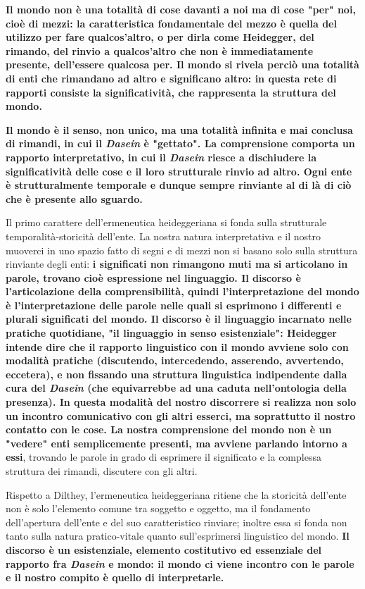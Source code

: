 \textbf{Il mondo non è una totalità di cose davanti a noi
ma di cose "per" noi, cioè di mezzi: la caratteristica
fondamentale del mezzo è quella del utilizzo per
fare qualcos'altro, o per dirla come Heidegger, del
rimando, del rinvio a qualcos'altro che non è
immediatamente presente, dell'essere qualcosa per.
Il mondo si rivela perciò una totalità di enti che
rimandano ad altro e significano altro: in questa
rete di rapporti consiste la significatività, che rappresenta la
struttura del mondo.}

\textbf{Il mondo è il senso, non unico, ma una totalità
infinita e mai conclusa di rimandi, in cui il \textit{Dasein}
è "gettato".
La comprensione comporta un rapporto interpretativo,
in cui il \textit{Dasein} riesce a dischiudere la
significatività delle cose e il loro strutturale
rinvio ad altro. Ogni ente è strutturalmente
temporale e dunque sempre rinviante al di là di
ciò che è presente allo sguardo.}

Il primo carattere dell'ermeneutica heideggeriana si fonda sulla strutturale
temporalità-storicità dell'ente.
La nostra natura interpretativa e il nostro muoverci in uno spazio fatto di segni e
di mezzi non si
basano solo sulla struttura rinviante degli enti:
\textbf{i significati non rimangono muti ma si
articolano in parole, trovano cioè espressione
nel linguaggio.
Il discorso è l'articolazione della comprensibilità,
quindi l'interpretazione del mondo è l'interpretazione delle parole nelle quali si esprimono i differenti e plurali significati del mondo.
Il discorso è il linguaggio incarnato nelle pratiche
quotidiane, "il linguaggio in senso esistenziale": Heidegger intende dire che
il rapporto linguistico con il mondo avviene solo con
modalità pratiche (discutendo, intercedendo, asserendo,
avvertendo, eccetera), e non fissando una struttura
linguistica indipendente dalla cura del \textit{Dasein}
(che equivarrebbe ad una caduta nell'ontologia
della presenza).
In questa modalità del nostro discorrere si realizza
non solo un incontro comunicativo con gli altri
esserci, ma soprattutto il nostro contatto con le
cose. La nostra comprensione del mondo non
è un "vedere" enti semplicemente presenti, ma avviene
parlando intorno a essi}, trovando le parole in
grado di esprimere il significato e la complessa
struttura dei rimandi, discutere con gli altri.

Rispetto a Dilthey, l'ermeneutica heideggeriana
ritiene che la storicità dell'ente non è solo l'elemento
comune tra soggetto e oggetto, ma  il fondamento
dell'apertura dell'ente e del suo caratteristico
rinviare; inoltre essa si fonda non tanto sulla
natura pratico-vitale quanto sull'esprimersi
linguistico del mondo. 
\textbf{Il discorso è un
esistenziale, elemento costitutivo ed
essenziale del rapporto fra \textit{Dasein} e mondo:
il mondo ci viene incontro con le parole e
il nostro compito è quello di interpretarle.}

